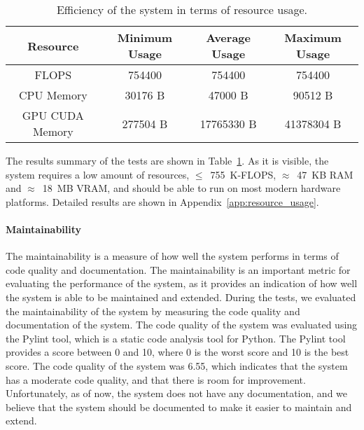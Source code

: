 \begin{table}[!htbp]
    \centering
    \begin{tabular}{|c||c|c|c|}
        \hline
        \textbf{Resource} & \textbf{Minimum Usage} & \textbf{Average Usage} & \textbf{Maximum Usage} \\
        \hline
        \hline
        FLOPS & 754400 & 754400 & 754400\\
        \hline
        CPU Memory & 30176 B & 47000 B & 90512 B \\
        \hline
        GPU CUDA Memory & 277504 B & 17765330 B  & 41378304 B \\
        \hline
    \end{tabular}
    \caption{Efficiency of the system in terms of resource usage.}\label{tab:efficiency}
\end{table}
The results summary of the tests are shown in Table~\ref{tab:efficiency}.
As it is visible, the system requires a low amount of resources, $\le$~755~K-FLOPS, $\approx$~47~KB RAM and $\approx$~18~MB VRAM, and should be able to run on most modern hardware platforms.
Detailed results are shown in Appendix~\ref{app:resource_usage}.

\paragraph{Maintainability}
The maintainability is a measure of how well the system performs in terms of code quality and documentation.
The maintainability is an important metric for evaluating the performance of the system, as it provides an indication of how well the system is able to be maintained and extended.
During the tests, we evaluated the maintainability of the system by measuring the code quality and documentation of the system.
The code quality of the system was evaluated using the Pylint tool, which is a static code analysis tool for Python.
The Pylint tool provides a score between 0 and 10, where 0 is the worst score and 10 is the best score.
The code quality of the system was 6.55, which indicates that the system has a moderate code quality, and that there is room for improvement.
Unfortunately, as of now, the system does not have any documentation, and we believe that the system should be documented to make it easier to maintain and extend.

